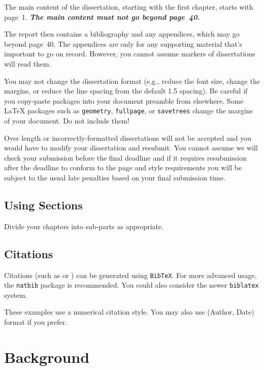 \documentclass[bsc,frontabs,singlespacing,parskip,deptreport]{infthesis}
\begin{document}
The main content of the dissertation, starting with the first chapter,
starts with page~1. \emph{\textbf{The main content must not go beyond page~40.}}

The report then contains a bibliography and any appendices, which may go beyond
page~40. The appendices are only for any supporting material that's important to
go on record. However, you cannot assume markers of dissertations will read them.

You may not change the dissertation format (e.g., reduce the font size, change
the margins, or reduce the line spacing from the default 1.5 spacing). Be
careful if you copy-paste packages into your document preamble from elsewhere.
Some \LaTeX{} packages such as \texttt{geometry}, \texttt{fullpage}, or
\texttt{savetrees} change the margins of your document. Do not include them!

Over length or incorrectly-formatted dissertations will not be accepted and you
would have to modify your dissertation and resubmit. You cannot assume we will
check your submission before the final deadline and if it requires resubmission
after the deadline to conform to the page and style requirements you will be
subject to the usual late penalties based on your final submission time.

\section{Using Sections}

Divide your chapters into sub-parts as appropriate.

\section{Citations}

Citations (such as \cite{P1} or \cite{P2}) can be generated using
\texttt{BibTeX}. For more advanced usage, the \texttt{natbib} package is
recommended. You could also consider the newer \texttt{biblatex} system.

These examples use a numerical citation style. You may also use
(Author, Date) format if you prefer.

\chapter{Background}

\end{document}
